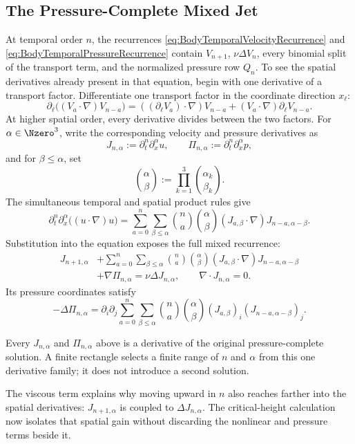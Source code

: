 
\subsection{The Pressure-Complete Mixed Jet}\label{sub:ThePressureCompleteMixedJet}

At temporal order \(n\), the recurrences \eqref{eq:BodyTemporalVelocityRecurrence} and \eqref{eq:BodyTemporalPressureRecurrence} contain \(V_{n+1}\), \(\nu\Delta V_n\), every binomial split of the transport term, and the normalized pressure row \(Q_n\).
To see the spatial derivatives already present in that equation, begin with one derivative of a transport factor.
Differentiate one transport factor in the coordinate direction \(x_\ell\):
\[
  \partial_\ell\bigl((V_a\cdot\nabla)V_{n-a}\bigr)
  =
  ((\partial_\ell V_a)\cdot\nabla)V_{n-a}
  +(V_a\cdot\nabla)\partial_\ell V_{n-a}.
\]
At higher spatial order, every derivative divides between the two factors.
For \(\alpha\in\Nzero^3\), write the corresponding velocity and pressure derivatives as
\[
  J_{n,\alpha}
  :=
  \partial_t^n\partial_x^\alpha u,
  \qquad
  \Pi_{n,\alpha}
  :=
  \partial_t^n\partial_x^\alpha p,
\]
and for \(\beta\le\alpha\), set
\[
  \binom{\alpha}{\beta}
  :=
  \prod_{k=1}^{3}\binom{\alpha_k}{\beta_k}.
\]
The simultaneous temporal and spatial product rules give
\[
  \partial_t^n\partial_x^\alpha\bigl((u\cdot\nabla)u\bigr)
  =
  \sum_{a=0}^{n}
  \sum_{\beta\le\alpha}
  \binom{n}{a}
  \binom{\alpha}{\beta}
  (J_{a,\beta}\cdot\nabla)
  J_{n-a,\alpha-\beta}.
\]
Substitution into the equation exposes the full mixed recurrence:
\begin{align*}
  J_{n+1,\alpha}
  &+
  \sum_{a=0}^{n}
  \sum_{\beta\le\alpha}
  \binom{n}{a}
  \binom{\alpha}{\beta}
  (J_{a,\beta}\cdot\nabla)
  J_{n-a,\alpha-\beta}
  \\
  &+\nabla\Pi_{n,\alpha}
  =
  \nu\Delta J_{n,\alpha},
  \qquad
  \nabla\cdot J_{n,\alpha}=0.
\end{align*}
Its pressure coordinates satisfy
\[
  -\Delta\Pi_{n,\alpha}
  =
  \partial_i\partial_j
  \sum_{a=0}^{n}
  \sum_{\beta\le\alpha}
  \binom{n}{a}
  \binom{\alpha}{\beta}
  (J_{a,\beta})_i
  (J_{n-a,\alpha-\beta})_j.
\]

Every \(J_{n,\alpha}\) and \(\Pi_{n,\alpha}\) above is a derivative of the original pressure-complete solution.
A finite rectangle selects a finite range of \(n\) and \(\alpha\) from this one derivative family; it does not introduce a second solution.

The viscous term explains why moving upward in \(n\) also reaches farther into the spatial derivatives: \(J_{n+1,\alpha}\) is coupled to \(\Delta J_{n,\alpha}\).
The critical-height calculation now isolates that spatial gain without discarding the nonlinear and pressure terms beside it.

